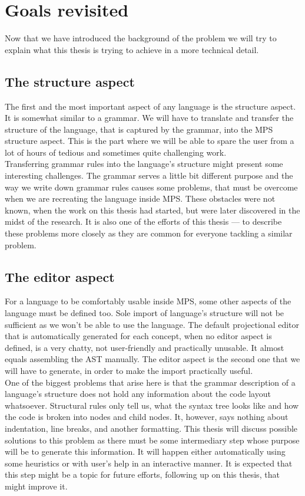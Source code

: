 \chapter{Goals revisited}

Now that we have introduced the background of the problem we will try to explain what this thesis is trying to achieve in a more technical detail.

\section{The structure aspect}
The first and the most important aspect of any language is the structure aspect.
It is somewhat similar to a grammar.
We will have to translate and transfer the structure of the language, that is captured by the grammar, into the MPS structure aspect.
This is the part where we will be able to spare the user from a lot of hours of tedious and sometimes quite challenging work.
\\

Transferring grammar rules into the language's structure might present some interesting challenges.
The grammar serves a little bit different purpose and the way we write down grammar rules causes some problems, that must be overcome when we are recreating the language inside MPS.
These obstacles were not known, when the work on this thesis had started, but were later discovered in the midst of the research.
It is also one of the efforts of this thesis --- to describe these problems more closely as they are common for everyone tackling a similar problem.

\section{The editor aspect}
For a language to be comfortably usable inside MPS, some other aspects of the language must be defined too.
Sole import of language's structure will not be sufficient as we won't be able to use the language.
The default projectional editor that is automatically generated for each concept, when no editor aspect is defined, is a very chatty, not user-friendly and practically unusable.
It almost equals assembling the AST manually.
The editor aspect is the second one that we will have to generate, in order to make the import practically useful.
\\

One of the biggest problems that arise here is that the grammar description of a language's structure does not hold any information about the code layout whatsoever.
Structural rules only tell us, what the syntax tree looks like and how the code is broken into nodes and child nodes.
It, however, says nothing about indentation, line breaks, and another formatting.
This thesis will discuss possible solutions to this problem as there must be some intermediary step whose purpose will be to generate this information.
It will happen either automatically using some heuristics or with user's help in an interactive manner.
It is expected that this step might be a topic for future efforts, following up on this thesis, that might improve it.


